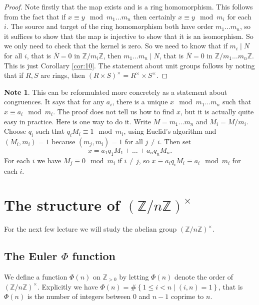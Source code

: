 \documentclass{article}
\newcommand{\Z}{\mathbb{Z}}
\newcommand{\rb}[1]{\left( #1 \right)}
\newcommand{\cb}[1]{\left\{ #1 \right\}}
\newcommand{\unit}[1]{\rb{\Z / #1\Z}^\times}
\theoremstyle{definition}\newtheorem{definition}{Definition}
\theoremstyle{definition}\newtheorem*{remark}{Remark}
\theoremstyle{definition}\newtheorem*{example}{Example}
\theoremstyle{definition}\newtheorem*{note}{Note}
\begin{document}
\begin{proof}
Note firstly that the map exists and is a ring homomorphism. This follows from the fact that if $ x \equiv y \mod m_1 \dots m_n $ then certainly $ x \equiv y \mod m_i $ for each $ i $. The source and target of the ring homomorphism both have order $ m_1 \dots m_n $, so it suffices to show that the map is injective to show that it is an isomorphism. So we only need to check that the kernel is zero. So we need to know that if $ m_i \mid N $ for all $ i $, that is $ \overline{N} = 0 $ in $ \Z / m_i\Z $, then $ m_1 \dots m_n \mid N $, that is $ \overline{N} = 0 $ in $ \Z / m_1 \dots m_n\Z $. This is just Corollary \ref{cor:10}. The statement about unit groups follows by noting that if $ R, S $ are rings, then $ \rb{R \times S}^\times = R^\times \times S^\times $.
\end{proof}

\begin{note}
This can be reformulated more concretely as a statement about congruences. It says that for any $ a_i $, there is a unique $ x \mod m_1 \dots m_n $ such that $ x \equiv a_i \mod m_i $. The proof does not tell us how to find $ x $, but it is actually quite easy in practice. Here is one way to do it. Write $ M = m_1 \dots m_n $ and $ M_i = M / m_i $. Choose $ q_i $ such that $ q_iM_i \equiv 1 \mod m_i $, using Euclid's algorithm and $ \rb{M_i, m_i} = 1 $ because $ \rb{m_j, m_i} = 1 $ for all $ j \ne i $. Then set
$$ x = a_1q_1M_1 + \dots + a_nq_nM_n. $$
For each $ i $ we have $ M_j \equiv 0 \mod m_i $ if $ i \ne j $, so $ x \equiv a_iq_iM_i \equiv a_i \mod m_i $ for each $ i $.
\end{note}

\section{The structure of $ \unit{n} $}

For the next few lecture we will study the abelian group $ \unit{n} $.

\subsection{The Euler $ \Phi $ function}

We define a function $ \Phi\rb{n} $ on $ \Z_{> 0} $ by letting $ \Phi\rb{n} $ denote the order of $ \unit{n} $. Explicitly we have $ \Phi\rb{n} = \#\cb{1 \le i < n \mid \rb{i, n} = 1} $, that is $ \Phi\rb{n} $ is the number of integers between $ 0 $ and $ n - 1 $ coprime to $ n $.
\end{document}
